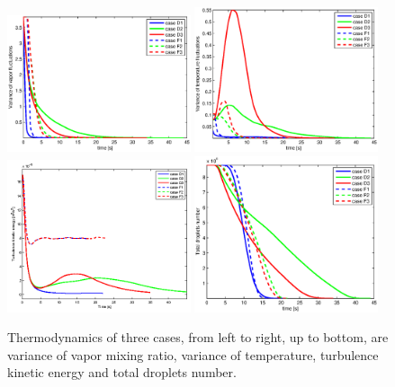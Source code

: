 \documentclass[12pt]{article}
\begin{document}
\begin{figure}[H]
\includegraphics[width=0.48\textwidth]{Figures/vap_var}
\includegraphics[width=0.48\textwidth]{Figures/temp_var}\\
\includegraphics[width=0.48\textwidth]{Figures/tke}
\includegraphics[width=0.48\textwidth]{Figures/num_tot}
\caption{Thermodynamics of three cases, from left to right, up to bottom, are variance of vapor mixing ratio, variance of temperature, turbulence kinetic energy and total droplets number.\label{fig:therm_dynam}}
\end{figure}
\end{document}
